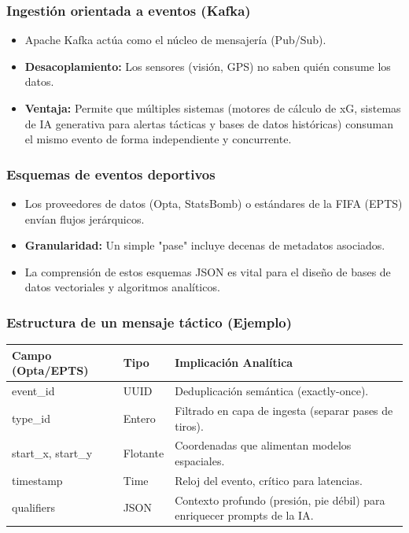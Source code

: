 \documentclass[aspectratio=169]{beamer}
\begin{document}
\begin{frame}\frametitle{Ingestión orientada a eventos (Kafka)}
\begin{itemize}
    \item Apache Kafka actúa como el núcleo de mensajería (Pub/Sub).
    \item \textbf{Desacoplamiento:} Los sensores (visión, GPS) no saben quién consume los datos.
    \item \textbf{Ventaja:} Permite que múltiples sistemas (motores de cálculo de xG, sistemas de IA generativa para alertas tácticas y bases de datos históricas) consuman el mismo evento de forma independiente y concurrente.
\end{itemize}
\end{frame}

\begin{frame}\frametitle{Esquemas de eventos deportivos}
\begin{itemize}
    \item Los proveedores de datos (Opta, StatsBomb) o estándares de la FIFA (EPTS) envían flujos jerárquicos.
    \item \textbf{Granularidad:} Un simple "pase" incluye decenas de metadatos asociados.
    \item La comprensión de estos esquemas JSON es vital para el diseño de bases de datos vectoriales y algoritmos analíticos.
\end{itemize}
\end{frame}

\begin{frame}\frametitle{Estructura de un mensaje táctico (Ejemplo)}
\begin{center}
\small
\begin{tabular}{l l >{\raggedright\arraybackslash}p{7.6cm}}
\hline
\textbf{Campo (Opta/EPTS)} & \textbf{Tipo} & \textbf{Implicación Analítica} \\
\hline
event\_id & UUID & Deduplicación semántica (exactly-once). \\
type\_id & Entero & Filtrado en capa de ingesta (separar pases de tiros). \\
start\_x, start\_y & Flotante & Coordenadas que alimentan modelos espaciales. \\
timestamp & Time & Reloj del evento, crítico para latencias. \\
qualifiers & JSON & Contexto profundo (presión, pie débil) para enriquecer prompts de la IA. \\
\hline
\end{tabular}
\end{center}
\end{frame}
\end{document}
